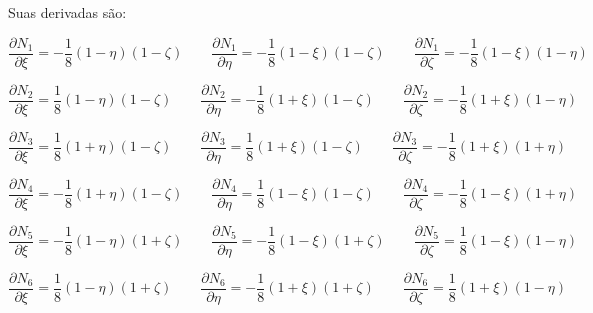         Suas derivadas são:

        \begin{equation*}
            \frac{\partial N_1}{\partial \xi} = -\frac{1}{8}\left(1-\eta\right)\left(1-\zeta\right)  \quad \quad 
            \frac{\partial N_1}{\partial \eta} = -\frac{1}{8}\left(1-\xi\right)\left(1-\zeta\right)  \quad \quad 
            \frac{\partial N_1}{\partial \zeta} = -\frac{1}{8}\left(1-\xi\right)\left(1-\eta\right)
        \end{equation*}

        \begin{equation*}
            \frac{\partial N_2}{\partial \xi} =  \frac{1}{8}\left(1-\eta\right)\left(1-\zeta\right)  \quad \quad 
            \frac{\partial N_2}{\partial \eta} = -\frac{1}{8}\left(1+\xi\right)\left(1-\zeta\right)  \quad \quad 
            \frac{\partial N_2}{\partial \zeta} = -\frac{1}{8}\left(1+\xi\right)\left(1-\eta\right)
        \end{equation*}

        \begin{equation*}
            \frac{\partial N_3}{\partial \xi} =  \frac{1}{8}\left(1+\eta\right)\left(1-\zeta\right)  \quad \quad 
            \frac{\partial N_3}{\partial \eta} =  \frac{1}{8}\left(1+\xi\right)\left(1-\zeta\right)  \quad \quad 
            \frac{\partial N_3}{\partial \zeta} = -\frac{1}{8}\left(1+\xi\right)\left(1+\eta\right)
        \end{equation*}

        \begin{equation*}
            \frac{\partial N_4}{\partial \xi} = -\frac{1}{8}\left(1+\eta\right)\left(1-\zeta\right)  \quad \quad 
            \frac{\partial N_4}{\partial \eta} =  \frac{1}{8}\left(1-\xi\right)\left(1-\zeta\right)  \quad \quad 
            \frac{\partial N_4}{\partial \zeta} = -\frac{1}{8}\left(1-\xi\right)\left(1+\eta\right)
        \end{equation*}

        \begin{equation*}
            \frac{\partial N_5}{\partial \xi} = -\frac{1}{8}\left(1-\eta\right)\left(1+\zeta\right)  \quad \quad 
            \frac{\partial N_5}{\partial \eta} = -\frac{1}{8}\left(1-\xi\right)\left(1+\zeta\right)  \quad \quad 
            \frac{\partial N_5}{\partial \zeta} =  \frac{1}{8}\left(1-\xi\right)\left(1-\eta\right)
        \end{equation*}

        \begin{equation*}
            \frac{\partial N_6}{\partial \xi} =  \frac{1}{8}\left(1-\eta\right)\left(1+\zeta\right)  \quad \quad 
            \frac{\partial N_6}{\partial \eta} = -\frac{1}{8}\left(1+\xi\right)\left(1+\zeta\right)  \quad \quad 
            \frac{\partial N_6}{\partial \zeta} =  \frac{1}{8}\left(1+\xi\right)\left(1-\eta\right)
        \end{equation*}

